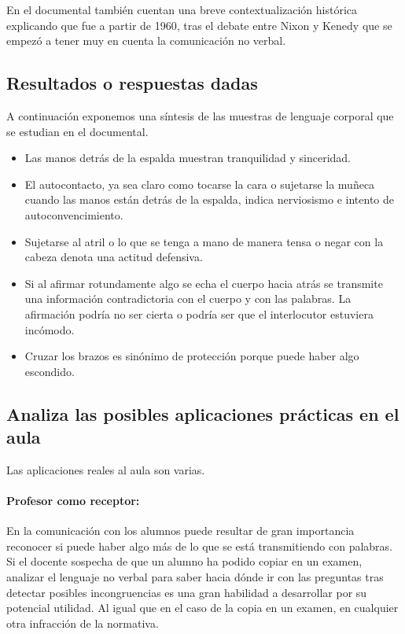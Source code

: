 \documentclass[palatino,nochap]{apuntesURJC}
\begin{document}
En el documental también cuentan una breve contextualización histórica explicando que fue a partir de 1960, tras el debate entre Nixon y Kenedy que se empezó a tener muy en cuenta la comunicación no verbal.


\subsection{Resultados o respuestas dadas}

A continuación exponemos una síntesis de las muestras de lenguaje corporal que se estudian en el documental.

\begin{itemize}
\item Las manos detrás de la espalda muestran tranquilidad y sinceridad.
\item El autocontacto, ya sea claro como tocarse la cara o sujetarse la muñeca cuando las manos están detrás de la espalda, indica nerviosismo e intento de autoconvencimiento.
\item Sujetarse al atril o lo que se tenga a mano de manera tensa o negar con la cabeza denota una actitud defensiva.
\item Si al afirmar rotundamente algo se echa el cuerpo hacia atrás se transmite una información contradictoria con el cuerpo y con las palabras. La afirmación podría no ser cierta o podría ser que el interlocutor estuviera incómodo.
\item Cruzar los brazos es sinónimo de protección porque puede haber algo escondido.
\end{itemize}


\subsection{Analiza las posibles aplicaciones prácticas en el aula}

Las aplicaciones reales al aula son varias.

\paragraph{Profesor como receptor:} 
%
En la comunicación con los alumnos puede resultar de gran importancia reconocer si puede haber algo más de lo que se  está transmitiendo con palabras.
%
Si el docente sospecha de que un alumno ha podido copiar en un examen, analizar el lenguaje no verbal para saber hacia dónde ir con las preguntas tras detectar posibles incongruencias es una gran habilidad a desarrollar por su potencial utilidad.
%
Al igual que en el caso de la copia en un examen, en cualquier otra infracción de la normativa.
\end{document}
